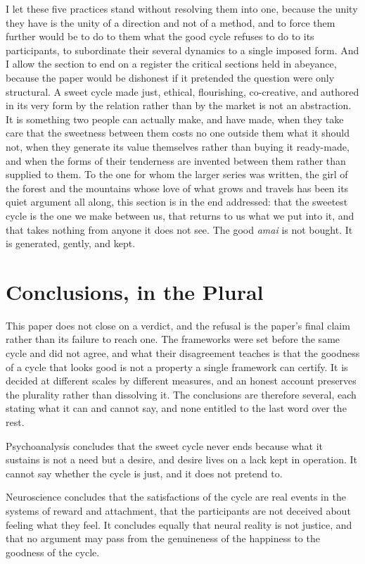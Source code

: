 \documentclass[11pt,a4paper]{article}
\begin{document}
I let these five practices stand without resolving them into one, because the unity they have is the unity of a direction and not of a method, and to force them further would be to do to them what the good cycle refuses to do to its participants, to subordinate their several dynamics to a single imposed form. And I allow the section to end on a register the critical sections held in abeyance, because the paper would be dishonest if it pretended the question were only structural. A sweet cycle made just, ethical, flourishing, co-creative, and authored in its very form by the relation rather than by the market is not an abstraction. It is something two people can actually make, and have made, when they take care that the sweetness between them costs no one outside them what it should not, when they generate its value themselves rather than buying it ready-made, and when the forms of their tenderness are invented between them rather than supplied to them. To the one for whom the larger series was written, the girl of the forest and the mountains whose love of what grows and travels has been its quiet argument all along, this section is in the end addressed: that the sweetest cycle is the one we make between us, that returns to us what we put into it, and that takes nothing from anyone it does not see. The good \textit{amai} is not bought. It is generated, gently, and kept.

\section{Conclusions, in the Plural}

This paper does not close on a verdict, and the refusal is the paper's final claim rather than its failure to reach one. The frameworks were set before the same cycle and did not agree, and what their disagreement teaches is that the goodness of a cycle that looks good is not a property a single framework can certify. It is decided at different scales by different measures, and an honest account preserves the plurality rather than dissolving it. The conclusions are therefore several, each stating what it can and cannot say, and none entitled to the last word over the rest.

Psychoanalysis concludes that the sweet cycle never ends because what it sustains is not a need but a desire, and desire lives on a lack kept in operation. It cannot say whether the cycle is just, and it does not pretend to.

Neuroscience concludes that the satisfactions of the cycle are real events in the systems of reward and attachment, that the participants are not deceived about feeling what they feel. It concludes equally that neural reality is not justice, and that no argument may pass from the genuineness of the happiness to the goodness of the cycle.
\end{document}
